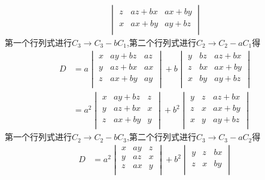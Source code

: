 \begin{questions}
\begin{solution}
\begin{align*}
\begin{vmatrix}
            z & az + bx & ax + by \\
            x & ax + by & ay + bz \\
            \end{vmatrix}
        \end{align*}
        第一个行列式进行$C_3 \rightarrow C_3-bC_1$,第二个行列式进行$C_2 \rightarrow C_2-aC_1$得
        \begin{align*}
            D&=a\begin{vmatrix}
            x & ay + bz & az \\
            y & az + bx & ax \\
            z & ax + by & ay \\
            \end{vmatrix}
            +b\begin{vmatrix}
            y & bz & az + bx \\
            z & bx & ax + by \\
            x & by & ay + bz \\
            \end{vmatrix}\\
            &=a^2\begin{vmatrix}
            x & ay + bz & z \\
            y & az + bx & x \\
            z & ax + by & y \\
            \end{vmatrix}
            +b^2\begin{vmatrix}
            y & z & az + bx \\
            z & x & ax + by \\
            x & y & ay + bz \\
            \end{vmatrix}
        \end{align*}第一个行列式进行$C_2 \rightarrow C_2-bC_3$,第二个行列式进行$C_3 \rightarrow C_3-aC_2$得
        \begin{align*}
            D&=a^2\begin{vmatrix}
            x & ay & z \\
            y & az & x \\
            z & ax & y \\
            \end{vmatrix}
            +b^2\begin{vmatrix}
            y & z & bx \\
            z & x & by \\

\end{vmatrix}
\end{align*}
\end{solution}
\end{questions}
